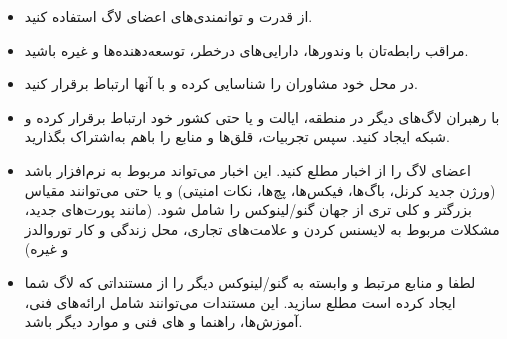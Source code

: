 \begin{itemize}
\item
از قدرت و توانمندی‌های اعضای لاگ استفاده کنید.
\item
مراقب رابطه‌تان با وندورها، دارایی‌های درخطر، توسعه‌دهنده‌ها و غیره باشید.
\item
در محل خود مشاوران را شناسایی کرده و با آنها ارتباط برقرار کنید.
\item
با رهبران لاگ‌های دیگر در منطقه، ایالت و یا حتی کشور خود ارتباط برقرار کرده
و شبکه ایجاد کنید. سپس تجربیات، قلق‌ها و منابع را باهم به‌اشتراک بگذارید.
\item
اعضای لاگ را از اخبار مطلع کنید. این اخبار می‌تواند مربوط به نرم‌افزار باشد
(ورژن جدید کرنل، باگ‌ها، فیکس‌ها، پچ‌ها، نکات امنیتی) و یا حتی می‌توانند مقیاس
بزرگتر و کلی تری از جهان گنو/لینوکس را شامل شود. (مانند پورت‌های جدید،
مشکلات مربوط به لایسنس کردن و علامت‌های تجاری، محل زندگی و کار توروالدز و غیره)
\item
لطفا
و منابع مرتبط و وابسته به گنو/لینوکس دیگر را از مستنداتی که لاگ شما
ایجاد کرده است مطلع سازید. این مستندات می‌توانند شامل ارائه‌های فنی،
آموزش‌ها، راهنما و ‌های فنی و موارد دیگر باشد.

\end{itemize}

